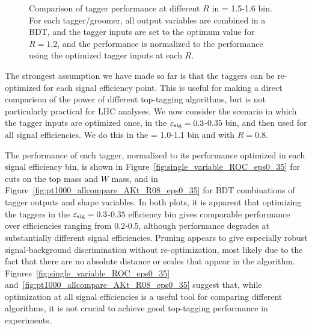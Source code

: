 \begin{figure}
\caption{Comparison of tagger performance at different $R$ in \pt = 1.5-1.6 \TeV bin. For each tagger/groomer, all output variables are combined in a BDT, and the tagger inputs are set to the optimum value for $R=1.2$, and the performance is normalized to the performance using the optimized tagger inputs at each $R$.}
\label{fig:Rcomparison_top_optOnce}
\end{figure}


The strongest assumption we have made so far is that the taggers can be re-optimized for each signal efficiency point. This is useful for making a direct comparison of the power of different top-tagging algorithms, but is not particularly practical for LHC analyses. We now consider the scenario in which the tagger inputs are optimized once, in the $\varepsilon_{\rm sig}=0.3$-$0.35$ bin, and then used for all signal efficiencies. We do this in the  \pt = 1.0-1.1 \TeV bin and with $R=0.8$.

The performance of each tagger, normalized to its performance optimized in each signal efficiency bin, is shown in Figure~\ref{fig:single_variable_ROC_eps0_35} for cuts on the top mass and $W$ mass, and in Figure~\ref{fig:pt1000_allcompare_AKt_R08_eps0_35} for BDT combinations of tagger outputs and shape variables. In both plots, it is apparent that optimizing the taggers in the $\varepsilon_{\rm sig}=0.3$-$0.35$ efficiency bin gives comparable performance over efficiencies ranging from 0.2-0.5, although performance degrades at substantially different signal efficiencies. Pruning appears to give especially robust signal-background discrimination without re-optimization, most likely due to the fact that there are no absolute distance or \pt scales that appear in the algorithm. Figures~\ref{fig:single_variable_ROC_eps0_35} and~\ref{fig:pt1000_allcompare_AKt_R08_eps0_35} suggest that, while optimization at all signal efficiencies is a useful tool for comparing different algorithms, it is not crucial to achieve good top-tagging performance in experiments.

